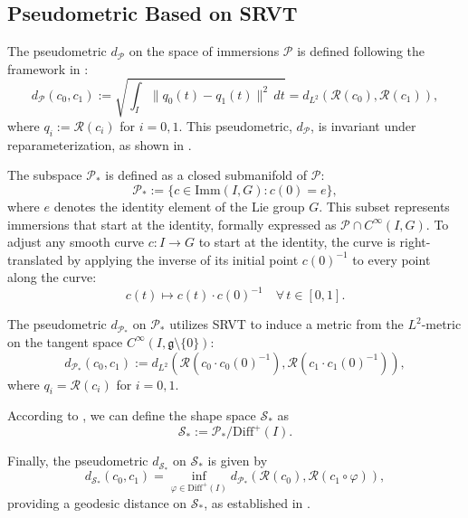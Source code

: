 \subsection{Pseudometric Based on SRVT}
\label{subsec:pseudometric-based-on-SRVT}

The pseudometric \(d_{\mathcal{P}}\) on the space of immersions \(\mathcal{P}\) is defined following the framework in \cite[Definition 3.7]{celledoniShapeAnalysisLie2016}:
\begin{equation}
    d_{\mathcal{P}}(c_0, c_1) := \sqrt{\int_I \|q_0(t) - q_1(t)\|^2 \, dt} = d_{L^2}(\mathcal{R}(c_0), \mathcal{R}(c_1)),
\end{equation}
where \(q_i := \mathcal{R}(c_i)\) for \(i = 0, 1\). This pseudometric, \(d_{\mathcal{P}}\), is invariant under reparameterization, as shown in \cite[Proposition 3.8]{celledoniShapeAnalysisLie2016}.

The subspace \(\mathcal{P}_*\) is defined as a closed submanifold of \(\mathcal{P}\):
\begin{equation}
    \mathcal{P}_* := \{c \in \mathrm{Imm}(I, G) : c(0) = e\},
\end{equation}
where \(e\) denotes the identity element of the Lie group \(G\). This subset represents immersions that start at the identity, formally expressed as \(\mathcal{P} \cap C^\infty(I, G)\). To adjust any smooth curve \(c: I \rightarrow G\) to start at the identity, the curve is right-translated by applying the inverse of its initial point \(c(0)^{-1}\) to every point along the curve:
\begin{equation}
    c(t) \mapsto c(t) \cdot c(0)^{-1} \quad \forall \, t \in [0,1].
\end{equation}

The pseudometric \(d_{\mathcal{P}_*}\) on \(\mathcal{P}_*\) utilizes SRVT to induce a metric from the \(L^2\)-metric on the tangent space \(C^\infty(I, \mathfrak{g} \setminus \{0\})\):
\begin{equation}
    d_{\mathcal{P}_*}(c_0, c_1) := 
    d_{L^2}(\mathcal{R}(c_0 \cdot c_0(0)^{-1}), \mathcal{R}(c_1 \cdot c_1(0)^{-1})),
\end{equation}
where \(q_i = \mathcal{R}(c_i)\) for \(i = 0, 1\).

According to \cite[Definition 3.10]{celledoniShapeAnalysisLie2016}, we can define the shape space \(\mathcal{S}_*\) as
\begin{equation}
    \mathcal{S}_* := \mathcal{P}_* / \mathrm{Diff}^+(I).
\end{equation}

Finally, the pseudometric \(d_{\mathcal{S}_*}\) on \(\mathcal{S}_*\) is given by
\begin{equation}
    d_{\mathcal{S}_*}(c_0, c_1) = \inf_{\varphi \in \mathrm{Diff}^+(I)} d_{\mathcal{P}_*}(\mathcal{R}(c_0), \mathcal{R}(c_1 \circ \varphi)),
    \label{eq:shape-space-metric-id}
\end{equation}
providing a geodesic distance on \(\mathcal{S}_*\), as established in \cite{bruverisGEODESICCOMPLETENESSSOBOLEV2014}.
